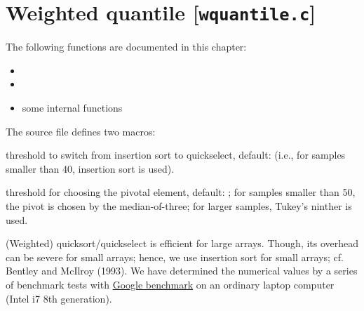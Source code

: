 \documentclass[a4paper,oneside,10pt,DIV=12]{scrreprt}
\begin{document}
\chapter{Weighted quantile [\texttt{wquantile.c}]}
\label{ch:wquantile}
The following functions are documented in this chapter:
\begin{itemize}
	\item {}
	\item {}
	\item some internal functions
\end{itemize} 

\noindent The source file  defines two macros: 
\begin{ldescription}
	\item[\code{\_n\_quickselect}] threshold to switch from insertion sort to
		quickselect, default:  (i.e., for samples smaller than 40,
		insertion sort is used).
	\item[\code{\_n\_ninther}] threshold for choosing the pivotal element,
		default: ; for samples smaller than 50, the pivot is chosen
		by the median-of-three; for larger samples, Tukey's ninther is used.
\end{ldescription} 
\noindent (Weighted) quicksort/quickselect is efficient for large arrays. 
Though, its overhead can be severe for small arrays; hence, we use insertion
sort for small arrays; cf. Bentley and McIlroy (1993). We have determined the
numerical values by a series of benchmark tests with 
\href{https://github.com/google/benchmark}{Google benchmark} on an ordinary 
laptop computer (Intel i7 8th generation). 
 
\end{document}
